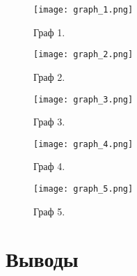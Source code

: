 \documentclass[12pt, a4paper]{report}
\begin{document}
	\newpage
	\vfill

	\begin{figure}

	\end{figure}

	\begin{figure}[h]
		\centering
		\texttt{[image: graph\_1.png]}
		\caption{Граф 1.}
	\end{figure}
	\begin{figure}[h]
		\centering
		\texttt{[image: graph\_2.png]}
		\caption{Граф 2.}
	\end{figure}
	\begin{figure}[h]
		\centering
		\texttt{[image: graph\_3.png]}
		\caption{Граф 3.}
	\end{figure}
	\begin{figure}[h]
		\centering
		\texttt{[image: graph\_4.png]}
		\caption{Граф 4.}
	\end{figure}
	\begin{figure}[h]
		\centering
		\texttt{[image: graph\_5.png]}
		\caption{Граф 5.}
	\end{figure} 

	\vfill
	\clearpage

	\section*{Выводы}
\end{document}
